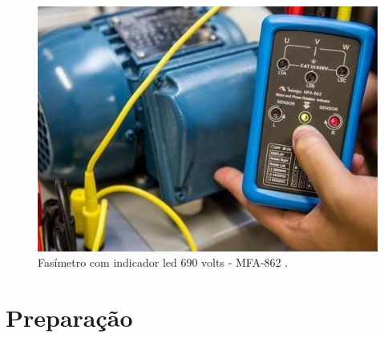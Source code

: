 \documentclass[a4paper,12pt,oneside,openany,table,xcdraw]{article}
\begin{document}
\vspace{0.5cm}
\begin{figure}[H]
\centering
\includegraphics[width=12.5cm]{fasimetro}
\caption{Fasímetro com indicador led 690 volts - MFA-862 \cite{fig1}.}
\label{intro:fig1}
\end{figure}
\vspace{0.3cm}


\section{Preparação}
\end{document}
